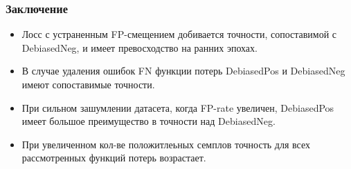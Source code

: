 \documentclass[
	11pt, %
]{beamer}
\begin{document}
\begin{frame}
	\frametitle{Заключение}

\scriptisize

\begin{itemize}
    \item Лосс с устраненным FP-смещением добивается точности, сопоставимой с DebiasedNeg, и имеет превосходство на ранних эпохах.
    \item В случае удаления ошибок FN функции потерь DebiasedPos и DebiasedNeg имеют сопоставимые точности.
    \item При сильном зашумлении датасета, когда FP-rate увеличен, DebiasedPos имеет большое преимущество в точности над DebiasedNeg.
    \item При увеличенном кол-ве положитлеьных семплов точность для всех рассмотренных функций потерь возрастает.
\end{itemize}

\end{frame}



\end{document}
